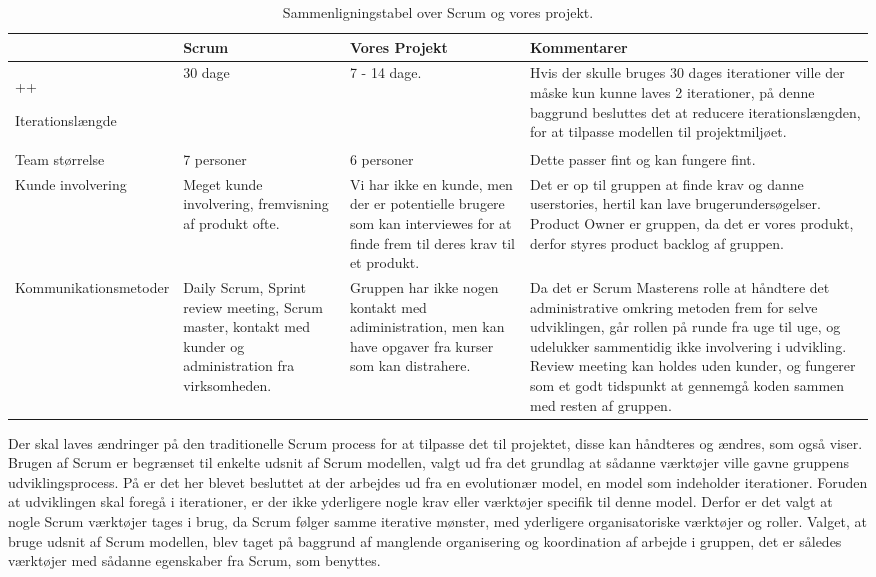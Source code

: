 \begin{sidewaystable}
      \begin{tabular}{p{5cm}p{5cm}p{5cm}p{5cm}}
	       				 & Scrum  & Vores Projekt & Kommentarer  \\ \hline++

	   Iterationslængde  		
	   		& 30 dage 
	   		& 7 - 14 dage. 
	   		& Hvis der skulle bruges 30 dages iterationer ville der måske kun kunne laves 2 iterationer, på denne baggrund besluttes det at reducere iterationslængden, for at tilpasse modellen til projektmiljøet.\\
	   		
	   Team størrelse    		
	   		& 7 personer
	   		& 6 personer 
	   		& Dette passer fint og kan fungere fint. \\
	   		
	   Kunde involvering 		
	   		& Meget kunde involvering, fremvisning af produkt ofte.
	   		& Vi har ikke en kunde, men der er potentielle brugere som kan interviewes for at finde frem til deres krav til et produkt.
	   		& Det er op til gruppen at finde krav og danne userstories, hertil kan lave brugerundersøgelser. Product Owner er gruppen, da det er vores produkt, derfor styres product backlog af gruppen.\\
	   		
	   Kommunikationsmetoder	
	   		& Daily Scrum, Sprint review meeting,  Scrum master, kontakt med kunder og administration fra virksomheden.
	   		& Gruppen har ikke nogen kontakt med adiministration, men kan have opgaver fra kurser som kan distrahere. 
	   		& Da det er Scrum Masterens rolle at håndtere det administrative omkring metoden frem for selve udviklingen, går rollen på runde fra uge til uge, og udelukker sammentidig ikke involvering i udvikling. Review meeting kan holdes uden kunder, og fungerer som et godt tidspunkt at gennemgå koden sammen med resten af gruppen. \\
    \end{tabular}
  \caption{Sammenligningstabel over Scrum og vores projekt.}\label{tabel:sammenligningstabel}
\end{sidewaystable}

Der skal laves ændringer på den traditionelle Scrum process  for at tilpasse det til projektet, disse kan håndteres og ændres, som  også viser.
Brugen af Scrum er begrænset til enkelte udsnit af Scrum modellen, valgt ud fra det grundlag at sådanne værktøjer ville gavne gruppens udviklingsprocess.
På  er det her blevet besluttet at der arbejdes ud fra en evolutionær model, en model som indeholder iterationer.
Foruden at udviklingen skal foregå i iterationer, er der ikke yderligere nogle krav eller værktøjer specifik til denne model.
Derfor er det valgt at nogle Scrum værktøjer tages i brug, da Scrum følger samme iterative mønster, med yderligere organisatoriske værktøjer og roller.
Valget, at bruge udsnit af Scrum modellen, blev taget på baggrund af manglende organisering og koordination af arbejde i gruppen, det er således værktøjer med sådanne egenskaber fra Scrum, som benyttes.

